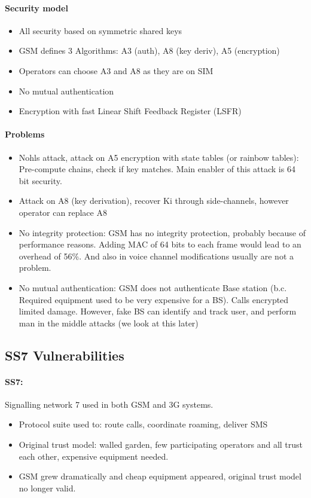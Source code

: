 \paragraph{Security model}
\begin{itemize}
    \item All security based on symmetric shared keys
    \item GSM defines 3 Algorithms: A3 (auth), A8 (key deriv), A5 (encryption)
    \item Operators can choose A3 and A8 as they are on SIM
    \item No mutual authentication
    \item Encryption with fast Linear Shift Feedback Register (LSFR)
    
\end{itemize}

\paragraph{Problems}
\begin{itemize}
    \item Nohls attack, attack on A5 encryption with state tables (or rainbow tables): 
    Pre-compute chains, check if key matches. 
    Main enabler of this attack is 64 bit security.
    \item Attack on A8 (key derivation), recover Ki through side-channels, however operator can replace A8
    \item No integrity protection: GSM has no integrity protection, probably because of performance reasons. Adding MAC of 64 bits to each frame would lead to an overhead of 56\%. And also in voice channel modifications usually are not a problem.
    \item No mutual authentication: GSM does not authenticate Base station (b.c. Required equipment used to be very expensive for a BS). Calls encrypted limited damage. However, fake BS can identify and track user, and perform man in the middle attacks (we look at this later)
\end{itemize}

\subsection{SS7 Vulnerabilities}

\paragraph{SS7:} Signalling network 7 used in both GSM and 3G systems.
\begin{itemize}
    \item Protocol suite used to: route calls, coordinate roaming, deliver SMS
    \item Original trust model: walled garden, few participating operators and all trust each other, expensive equipment needed.
    \item GSM grew dramatically and cheap equipment appeared, original trust model no longer valid.
\end{itemize}

